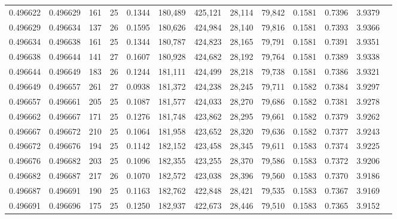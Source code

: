 \begin{tabular}{rrrrrrrrrrrrr}
0.496622 & 0.496629 & 161 &  25 &                                     0.1344 & 180,489 & 425,121 &  28,114 &  79,842 & 0.1581 & 0.7396 & 3.9379 \\
0.496629 & 0.496634 & 137 &  26 &                                     0.1595 & 180,626 & 424,984 &  28,140 &  79,816 & 0.1581 & 0.7393 & 3.9366 \\
0.496634 & 0.496638 & 161 &  25 &                                     0.1344 & 180,787 & 424,823 &  28,165 &  79,791 & 0.1581 & 0.7391 & 3.9351 \\
0.496638 & 0.496644 & 141 &  27 &                                     0.1607 & 180,928 & 424,682 &  28,192 &  79,764 & 0.1581 & 0.7389 & 3.9338 \\
0.496644 & 0.496649 & 183 &  26 &                                     0.1244 & 181,111 & 424,499 &  28,218 &  79,738 & 0.1581 & 0.7386 & 3.9321 \\
0.496649 & 0.496657 & 261 &  27 &                                     0.0938 & 181,372 & 424,238 &  28,245 &  79,711 & 0.1582 & 0.7384 & 3.9297 \\
0.496657 & 0.496661 & 205 &  25 &                                     0.1087 & 181,577 & 424,033 &  28,270 &  79,686 & 0.1582 & 0.7381 & 3.9278 \\
0.496662 & 0.496667 & 171 &  25 &                                     0.1276 & 181,748 & 423,862 &  28,295 &  79,661 & 0.1582 & 0.7379 & 3.9262 \\
0.496667 & 0.496672 & 210 &  25 &                                     0.1064 & 181,958 & 423,652 &  28,320 &  79,636 & 0.1582 & 0.7377 & 3.9243 \\
0.496672 & 0.496676 & 194 &  25 &                                     0.1142 & 182,152 & 423,458 &  28,345 &  79,611 & 0.1583 & 0.7374 & 3.9225 \\
0.496676 & 0.496682 & 203 &  25 &                                     0.1096 & 182,355 & 423,255 &  28,370 &  79,586 & 0.1583 & 0.7372 & 3.9206 \\
0.496682 & 0.496687 & 217 &  26 &                                     0.1070 & 182,572 & 423,038 &  28,396 &  79,560 & 0.1583 & 0.7370 & 3.9186 \\
0.496687 & 0.496691 & 190 &  25 &                                     0.1163 & 182,762 & 422,848 &  28,421 &  79,535 & 0.1583 & 0.7367 & 3.9169 \\
0.496691 & 0.496696 & 175 &  25 &                                     0.1250 & 182,937 & 422,673 &  28,446 &  79,510 & 0.1583 & 0.7365 & 3.9152 \\

\end{tabular}

